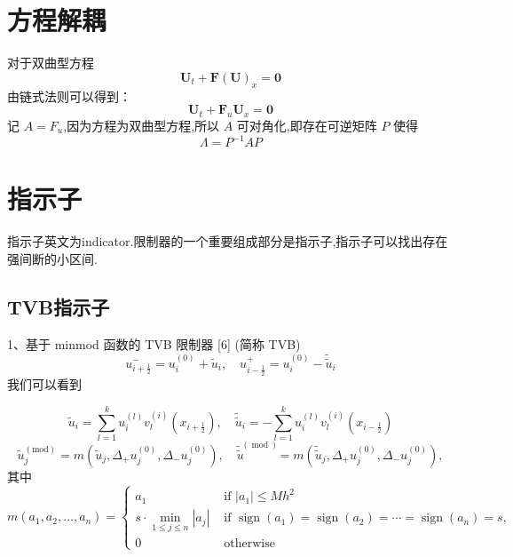 \documentclass{book}
\begin{document}
\section{方程解耦}
对于双曲型方程
\begin{equation}
    \mathbf{U}_{t}+\mathbf{F}(\mathbf{U})_{x}=\mathbf{0}
\end{equation}
由链式法则可以得到：
\begin{equation}
    \mathbf{U}_{t}+\mathbf{F}_u\mathbf{U}_{x}=\mathbf{0}
\end{equation}
记 $A=F_u$,因为方程为双曲型方程,所以 $A$ 可对角化,即存在可逆矩阵 $P$ 使得
\begin{equation}
    \Lambda = P^{-1}AP
\end{equation}

\section{指示子}
指示子英文为indicator.限制器的一个重要组成部分是指示子,指示子可以找出存在强间断的小区间.
\subsection{TVB指示子}
1、基于 minmod 函数的 TVB 限制器  [6]  (简称 TVB)
\begin{equation}
    u_{i+\frac{1}{2}}^{-}=u_{i}^{(0)}+\tilde{u}_{i}, \quad u_{i-\frac{1}{2}}^{+}=u_{i}^{(0)}-\tilde{\tilde{u}}_{i}
\end{equation}
我们可以看到

\begin{equation}
    \tilde{u}_{i}=\sum_{l=1}^{k} u_{i}^{(l)} v_{l}^{(i)}\left(x_{i+\frac{1}{2}}\right), \quad \tilde{\tilde{u}}_{i}=-\sum_{l=1}^{k} u_{i}^{(l)} v_{l}^{(i)}\left(x_{i-\frac{1}{2}}\right)
\end{equation}
\begin{equation}
    \tilde{u}_{j}^{(\mathrm{mod})}=m\left(\tilde{u}_{j}, \Delta_{+} u_{j}^{(0)}, \Delta_{-} u_{j}^{(0)}\right), \quad \tilde{\tilde{u}}^{(\bmod )}=m\left(\tilde{\tilde{u}}_{j}, \Delta_{+} u_{j}^{(0)}, \Delta_{-} u_{j}^{(0)}\right),
\end{equation}
其中
\begin{equation}
    m\left(a_{1}, a_{2}, \ldots, a_{n}\right)=\begin{cases}
        a_{1}                                             & \text { if }\left|a_{1}\right| \leq M h^{2}                                                                                              \\
        s \cdot \min _{1 \leq j \leq n}\left|a_{j}\right| & \text { if } \operatorname{sign}\left(a_{1}\right)=\operatorname{sign}\left(a_{2}\right)=\cdots=\operatorname{sign}\left(a_{n}\right)=s, \\
        0                                                 & \text { otherwise }
    \end{cases}
\end{equation}
\end{document}
